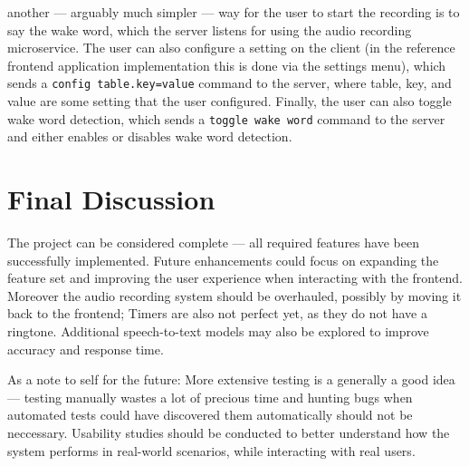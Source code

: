 another --- arguably much simpler --- way for the user to start the recording is to say the wake word, which the server listens for
using the audio recording microservice.
The user can also configure a setting on the client (in the reference frontend application implementation this is done via the settings menu),
which sends a \texttt{config table.key=value} command to the server, where table, key, and value are some setting that the user configured.
Finally, the user can also toggle wake word detection, which sends a \texttt{toggle wake word} command to the server and either enables or disables
wake word detection.

\section{Final Discussion}
The project can be considered complete --- all required features have been successfully implemented.
Future enhancements could focus on expanding the feature set and improving the user experience when interacting with the frontend.
Moreover the audio recording system should be overhauled, possibly by moving it back to the frontend;
Timers are also not perfect yet, as they do not have a ringtone.
Additional speech-to-text models may also be explored to improve accuracy and response time.

As a note to self for the future:
More extensive testing is a generally a good idea --- testing manually wastes a lot of precious time
and hunting bugs when automated tests could have discovered them automatically should not be neccessary.
Usability studies should be conducted to better understand how the system performs in real-world scenarios, while interacting with real users.
